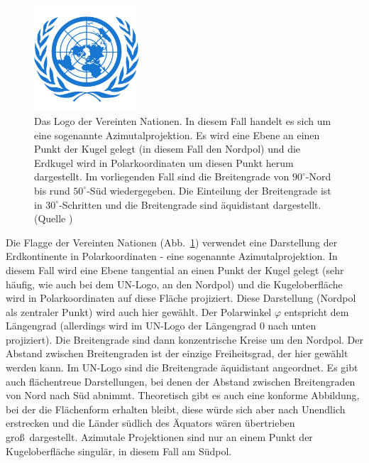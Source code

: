 \begin{figure}
\includegraphics[trim= 0cm 1.0cm 0cm 1.0cm,clip,width=0.35\textwidth]{./Bilder/un_PNG20.png}
\caption{\label{fig_UN}%
Das Logo der Vereinten Nationen. In diesem Fall handelt es sich um eine sogenannte
Azimutalprojektion. Es wird eine Ebene an einen Punkt der Kugel gelegt (in diesem Fall
den Nordpol) und die Erdkugel wird in Polarkoordinaten um diesen Punkt herum dargestellt. 
Im vorliegenden Fall sind die Breitengrade von $90^\circ$-Nord bis rund $50^\circ$-S\"ud wiedergegeben.
Die Einteilung der Breitengrade ist in $30^\circ$-Schritten und die Breitengrade sind
\"aquidistant dargestellt. (Quelle \cite{UN})}  
\end{figure}

Die Flagge der Vereinten Nationen (Abb.\ \ref{fig_UN})
verwendet eine Darstellung der Erdkontinente in Polarkoordinaten - eine sogenannte 
Azimutalprojektion.
In diesem Fall wird eine Ebene tangential an einen Punkt der Kugel gelegt (sehr h\"aufig, wie auch bei dem
UN-Logo, an den Nordpol) und die Kugeloberfl\"ache wird in Polarkoordinaten auf diese Fl\"ache
projiziert. Diese Darstellung (Nordpol als zentraler Punkt) wird auch hier gew\"ahlt.
Der Polarwinkel $\varphi$ entspricht dem L\"angengrad (allerdings wird im UN-Logo der
L\"angengrad $0$ nach unten projiziert). Die Breitengrade sind dann konzentrische Kreise um den
Nordpol. Der Abstand zwischen Breitengraden ist der einzige Freiheitsgrad, der hier gew\"ahlt
werden kann. Im UN-Logo sind die Breitengrade \"aquidistant angeordnet. Es gibt auch
fl\"achentreue Darstellungen, bei denen der Abstand zwischen Breitengraden von Nord nach
S\"ud abnimmt. Theoretisch gibt es auch eine konforme Abbildung, bei der die Fl\"achenform
erhalten bleibt, diese w\"urde sich aber nach Unendlich erstrecken und die L\"ander s\"udlich des
\"Aquators w\"aren \"ubertrieben gro\ss\ dargestellt. Azimutale Projektionen sind nur an einem
Punkt der Kugeloberfl\"ache singul\"ar, in diesem Fall am S\"udpol. 

